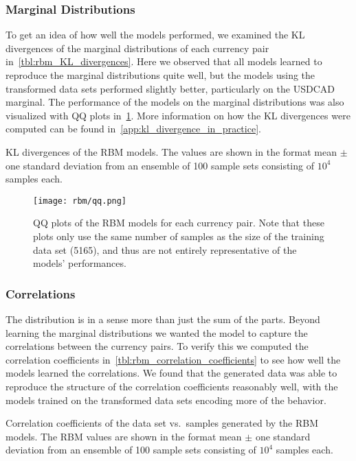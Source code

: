 \subsubsection{Marginal Distributions}
To get an idea of how well the models performed, we examined the KL divergences of the marginal distributions of each currency pair in~\cref{tbl:rbm_KL_divergences}.
Here we observed that all models learned to reproduce the marginal distributions quite well, but the models using the transformed data sets performed slightly better, particularly on the USDCAD marginal.
The performance of the models on the marginal distributions was also visualized with QQ plots in~\cref{fig:rbm_qq_plots}.
More information on how the KL divergences were computed can be found in~\cref{app:kl_divergence_in_practice}.
\begin{table}[!htb]
    \centering
    \begin{adjustbox}{max width=\textwidth}
        
    \end{adjustbox}
    \caption{
        KL divergences of the RBM models.
        The values are shown in the format mean \(\pm\) one standard deviation from an ensemble of 100 sample sets consisting of \( 10^4 \) samples each.
    }
    \label{tbl:rbm_KL_divergences}
\end{table}
\begin{figure}[!htb]
    \begin{center}
        \texttt{[image: rbm/qq.png]}
    \end{center}
    \caption{QQ plots of the RBM models for each currency pair. Note that these plots only use the same number of samples as the size of the training data set (5165), and thus are not entirely representative of the models' performances.}
    \label{fig:rbm_qq_plots}
\end{figure}

\subsubsection{Correlations}
The distribution is in a sense more than just the sum of the parts.
Beyond learning the marginal distributions we wanted the model to capture the correlations between the currency pairs.
To verify this we computed the correlation coefficients in~\cref{tbl:rbm_correlation_coefficients} to see how well the models learned the correlations.
We found that the generated data was able to reproduce the structure of the correlation coefficients reasonably well, with the models trained on the transformed data sets encoding more of the behavior.
\begin{table}[!htb]
    \centering
    \begin{adjustbox}{max width=\textwidth}
        
    \end{adjustbox}
    \caption{Correlation coefficients of the data set vs.~samples generated by the RBM models. The RBM values are shown in the format mean \(\pm\) one standard deviation from an ensemble of 100 sample sets consisting of \( 10^4 \) samples each.}
    \label{tbl:rbm_correlation_coefficients}
\end{table}

